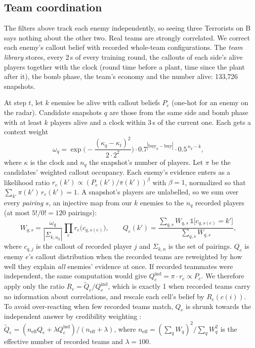 \documentclass[11pt]{article}
\newcommand{\1}{\mathbb{1}}
\begin{document}
\subsection{Team coordination}
\label{sec:team}
The filters above track each enemy independently, so seeing three Terrorists on B says nothing about the other two. Real teams are strongly correlated. We correct each enemy's callout belief with recorded whole-team configurations. The \emph{team library} stores, every 2\,s of every training round, the callouts of each side's alive players together with the clock (round time before a plant, time since the plant after it), the bomb phase, the team's economy and the number alive: 133{,}726 snapshots.

At step $t$, let $k$ enemies be alive with callout beliefs $P_e$ (one-hot for an enemy on the radar). Candidate snapshots $q$ are those from the same side and bomb phase with at least $k$ players alive and a clock within 3\,s of the current one. Each gets a context weight
\begin{equation}
  \omega_q = \exp\!\Big(-\frac{(\kappa_q - \kappa_t)^2}{2 \cdot 2^2}\Big) \cdot 0.7^{|\mathrm{buy}_q - \mathrm{buy}|} \cdot 0.5^{\,n_q - k},
\end{equation}
where $\kappa$ is the clock and $n_q$ the snapshot's number of players. Let $\pi$ be the candidates' weighted callout occupancy. Each enemy's evidence enters as a likelihood ratio $r_e(k') \propto (P_e(k')/\pi(k'))^{\beta}$ with $\beta = 1$, normalized so that $\sum_{k'} \pi(k')\, r_e(k') = 1$. A snapshot's players are unlabelled, so we sum over every \emph{pairing} $s$, an injective map from our $k$ enemies to the $n_q$ recorded players (at most $5!/0! = 120$ pairings):
\begin{equation}
  W_{q,s} = \frac{\omega_q}{|\Sigma_{k,n_q}|} \prod_{e} r_e\big(c_{q,s(e)}\big), \qquad
  Q_e(k') = \frac{\sum_{q,s} W_{q,s}\, \1\big[c_{q,s(e)} = k'\big]}{\sum_{q,s} W_{q,s}},
  \label{eq:team}
\end{equation}
where $c_{q,j}$ is the callout of recorded player $j$ and $\Sigma_{k,n}$ is the set of pairings. $Q_e$ is enemy $e$'s callout distribution when the recorded teams are reweighted by how well they explain \emph{all} enemies' evidence at once. If recorded teammates were independent, the same computation would give $Q^{\mathrm{ind}}_e = \pi \cdot r_e \propto P_e$. We therefore apply only the ratio $R_e = \tilde Q_e / Q^{\mathrm{ind}}_e$, which is exactly 1 when recorded teams carry no information about correlations, and rescale each cell's belief by $R_e(c(i))$. To avoid over-reacting when few recorded teams match, $Q_e$ is shrunk towards the independent answer by credibility weighting \citep{buhlmann1967experience}: $\tilde Q_e = (n_{\mathrm{eff}} Q_e + \lambda Q^{\mathrm{ind}}_e)/(n_{\mathrm{eff}} + \lambda)$, where $n_{\mathrm{eff}} = (\sum_q W_q)^2 / \sum_q W_q^2$ is the effective number of recorded teams and $\lambda = 100$.
\end{document}
